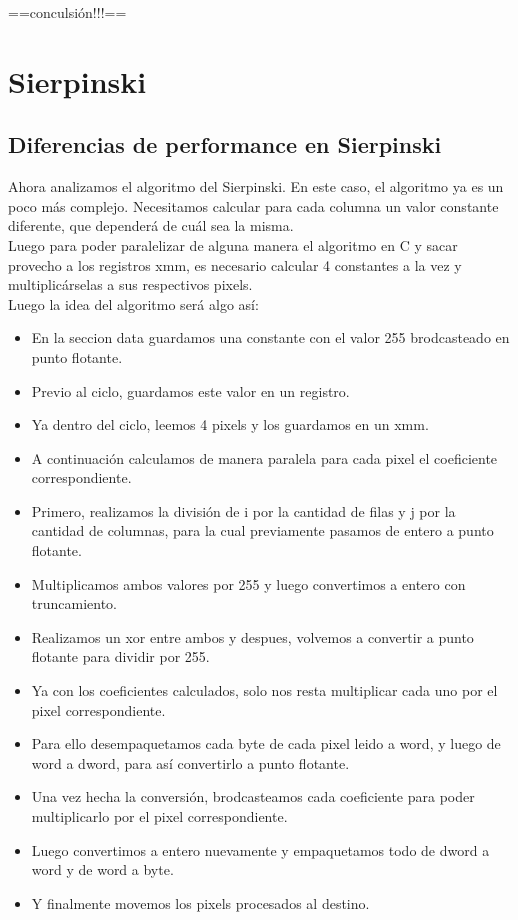 \documentclass[a4paper]{article}
\begin{document}
==conculsión!!!==

\newpage
\section{Sierpinski}
\subsection{Diferencias de performance en Sierpinski}
Ahora analizamos el algoritmo del Sierpinski. En este caso, el algoritmo ya es un poco más complejo. Necesitamos calcular para cada columna un valor constante diferente, que dependerá de cuál sea la misma.
\\
Luego para poder paralelizar de alguna manera el algoritmo en C y sacar provecho a los registros xmm, es necesario calcular 4 constantes a la vez y multiplicárselas a sus respectivos pixels.
\\
Luego la idea del algoritmo será algo así:

\begin{itemize}
\item En la seccion data guardamos una constante con el valor 255 brodcasteado en punto flotante.
\item Previo al ciclo, guardamos este valor en un registro.
\item Ya dentro del ciclo, leemos 4 pixels y los guardamos en un xmm.
\item A continuación calculamos de manera paralela para cada pixel el coeficiente correspondiente.
\item Primero, realizamos la división de i por la cantidad de filas y j por la cantidad de columnas, para la cual previamente pasamos de entero a punto flotante.
\item Multiplicamos ambos valores por 255 y luego convertimos a entero con truncamiento.
\item Realizamos un xor entre ambos y despues, volvemos a convertir a punto flotante para dividir por 255.
\item Ya con los coeficientes calculados, solo nos resta multiplicar cada uno por el pixel correspondiente.
\item Para ello desempaquetamos cada byte de cada pixel leido a word, y luego de word a dword, para así convertirlo a punto flotante.
\item Una vez hecha la conversión, brodcasteamos cada coeficiente para poder multiplicarlo por el pixel correspondiente.
\item Luego convertimos a entero nuevamente y empaquetamos todo de dword a word y de word a byte.
\item Y finalmente movemos los pixels procesados al destino.
\end{itemize}
\end{document}
